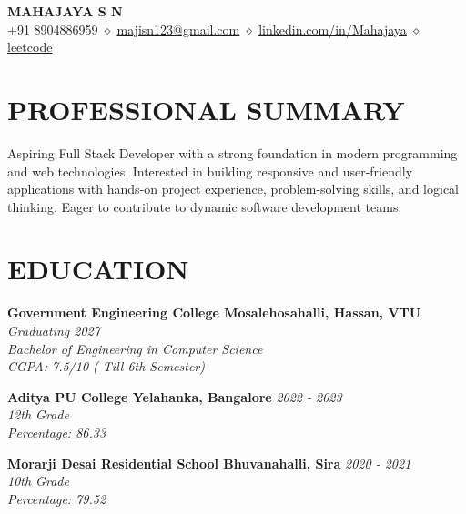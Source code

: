 \documentclass[9.5pt,a4paper]{extarticle}
\begin{document}
\begin{center}
{\Large \textbf{MAHAJAYA S N}} \\ \vspace{2pt}
+91 8904886959 $\diamond$ \href{mailto:majisn123@gmail.com}{majisn123@gmail.com} $\diamond$ \href{https://linkedin.com/in/Mahajaya}{linkedin.com/in/Mahajaya} $\diamond$ \href{https://leetcode}{leetcode}
\end{center}

\section*{PROFESSIONAL SUMMARY}
Aspiring Full Stack Developer with a strong foundation in modern programming and web technologies. Interested in building responsive and user-friendly applications with hands-on project experience, problem-solving skills, and logical thinking. Eager to contribute to dynamic software development teams.

\section*{EDUCATION}
\noindent \textbf{Government Engineering College Mosalehosahalli, Hassan, VTU} \hfill \textit{Graduating 2027} \\
\textit{Bachelor of Engineering in Computer Science} \\
\textit{CGPA: 7.5/10 ( Till 6th Semester)} \vspace{4pt}

\noindent \textbf{Aditya PU College Yelahanka, Bangalore} \hfill \textit{2022 - 2023} \\
\textit{12th Grade} \\
\textit{Percentage: 86.33} \vspace{4pt}

\noindent \textbf{Morarji Desai Residential School Bhuvanahalli, Sira} \hfill \textit{2020 - 2021} \\
\textit{10th Grade} \\
\textit{Percentage: 79.52} \vspace{4pt}


\end{document}
